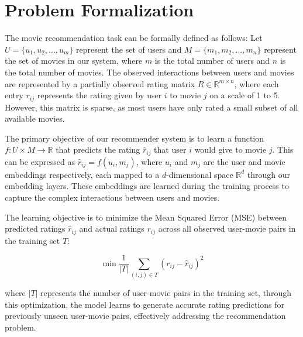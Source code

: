 \documentclass[sigconf]{acmart}
\begin{document}
\section{Problem Formalization}\label{sec:formal}
The movie recommendation task can be formally defined as follows: Let $U = \{u_1, u_2, ..., u_m\}$ represent the set of users and $M = \{m_1, m_2, ..., m_n\}$ represent the set of movies in our system, where $m$ is the total number of users and $n$ is the total number of movies. The observed interactions between users and movies are represented by a partially observed rating matrix $R \in \mathbb{R}^{m \times n}$, where each entry $r_{ij}$ represents the rating given by user $i$ to movie $j$ on a scale of 1 to 5. However, this matrix is sparse, as most users have only rated a small subset of all available movies.

The primary objective of our recommender system is to learn a function $f: U \times M \rightarrow \mathbb{R}$ that predicts the rating $\hat{r}_{ij}$ that user $i$ would give to movie $j$. This can be expressed as $\hat{r}_{ij} = f(u_i, m_j)$, where $u_i$ and $m_j$ are the user and movie embeddings respectively, each mapped to a $d$-dimensional space $\mathbb{R}^d$ through our embedding layers. These embeddings are learned during the training process to capture the complex interactions between users and movies.

The learning objective is to minimize the Mean Squared Error (MSE) between predicted ratings $\hat{r}_{ij}$ and actual ratings $r_{ij}$ across all observed user-movie pairs in the training set $T$:

\begin{equation}
\min \frac{1}{|T|} \sum_{(i,j) \in T} (r_{ij} - \hat{r}_{ij})^2
\end{equation}

where $|T|$ represents the number of user-movie pairs in the training set, through this optimization, the model learns to generate accurate rating predictions for previously unseen user-movie pairs, effectively addressing the recommendation problem.
\end{document}
